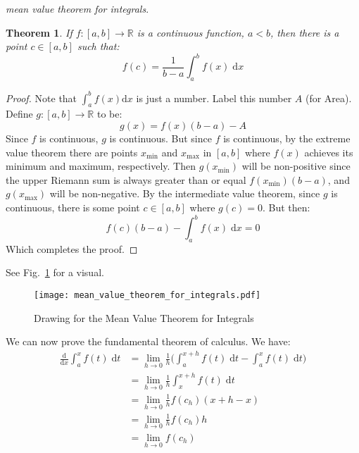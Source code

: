 \documentclass{article}
\theoremstyle{plain}
\newtheorem{theorem}{Theorem}
\begin{document}
    \textit{mean value theorem for integrals}.
    \begin{theorem}
        If $f:[a,b]\rightarrow\mathbb{R}$ is a continuous function, $a<b$,
        then there is a point $c\in[a,b]$ such that:
        \begin{equation}
            f(c)=\frac{1}{b-a}\int_{a}^{b}f(x)\;\textrm{d}x
        \end{equation}
    \end{theorem}
    \begin{proof}
        Note that $\int_{a}^{b}f(x)\textrm{d}x$ is just a number. Label this
        number $A$ (for Area). Define $g:[a,b]\rightarrow\mathbb{R}$ to be:
        \begin{equation}
            g(x)=f(x)(b-a)-A
        \end{equation}
        Since $f$ is continuous, $g$ is continuous. But since $f$ is continuous,
        by the extreme value theorem there are points $x_{\textrm{min}}$ and
        $x_{\textrm{max}}$ in $[a,b]$ where $f(x)$ achieves its minimum and
        maximum, respectively. Then $g(x_{\textrm{min}})$ will be
        non-positive since the upper Riemann sum is always greater than or
        equal $f(x_{\textrm{min}})(b-a)$, and $g(x_{\textrm{max}})$ will be
        non-negative. By the intermediate value theorem, since $g$ is
        continuous, there is some point $c\in[a,b]$ where $g(c)=0$. But then:
        \begin{equation}
            f(c)(b-a)-\int_{a}^{b}f(x)\;\textrm{d}x=0
        \end{equation}
        Which completes the proof.
    \end{proof}
    See Fig.~\ref{fig:mvt} for a visual.
    \begin{figure}
        \centering
        \texttt{[image: mean\_value\_theorem\_for\_integrals.pdf]}
        \caption{Drawing for the Mean Value Theorem for Integrals}
        \label{fig:mvt}
    \end{figure}
    We can now prove the fundamental theorem of calculus. We have:
    \begin{align}
        \frac{\textrm{d}}{\textrm{d}x}\int_{a}^{x}f(t)\;\textrm{d}t
        &=\lim_{h\rightarrow{0}}\frac{1}{h}\Big(
            \int_{a}^{x+h}f(t)\;\textrm{d}t-
            \int_{a}^{x}f(t)\;\textrm{d}t\Big)\\
        &=\lim_{h\rightarrow{0}}\frac{1}{h}
            \int_{x}^{x+h}f(t)\;\textrm{d}t\\
        &=\lim_{h\rightarrow{0}}\frac{1}{h}f(c_{h})(x+h-x)\\
        &=\lim_{h\rightarrow{0}}\frac{1}{h}f(c_{h})h\\
        &=\lim_{h\rightarrow{0}}f(c_{h})
    \end{align}
\end{document}
